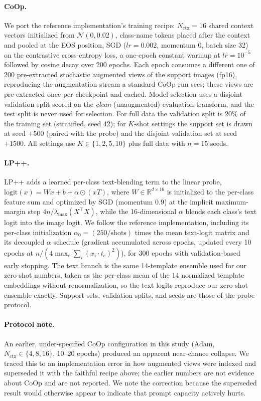 \documentclass[10pt,a4paper]{article}
\begin{document}
\paragraph{CoOp.} We port the reference implementation's training recipe: $N_{\mathrm{ctx}}=16$ shared context vectors initialized from $\mathcal{N}(0,0.02)$, class-name tokens placed after the context and pooled at the EOS position, SGD ($lr=0.002$, momentum 0, batch size 32) on the contrastive cross-entropy loss, a one-epoch constant warmup at $lr=10^{-5}$ followed by cosine decay over 200 epochs. Each epoch consumes a different one of 200 pre-extracted stochastic augmented views of the support images (fp16), reproducing the augmentation stream a standard CoOp run sees; these views are pre-extracted once per checkpoint and cached. Model selection uses a disjoint validation split scored on the \emph{clean} (unaugmented) evaluation transform, and the test split is never used for selection. For full data the validation split is 20\% of the training set (stratified, seed 42); for $K$-shot settings the support set is drawn at seed $+500$ (paired with the probe) and the disjoint validation set at seed $+1500$. All settings use $K\in\{1,2,5,10\}$ plus full data with $n=15$ seeds.

\paragraph{LP++.} LP++ adds a learned per-class text-blending term to the linear probe, $\mathrm{logit}(x)=Wx+b+\alpha\odot(xT)$, where $W\in\mathbb{R}^{d\times16}$ is initialized to the per-class feature sum and optimized by SGD (momentum 0.9) at the implicit maximum-margin step $4n/\lambda_{\max}(X^\top X)$, while the 16-dimensional $\alpha$ blends each class's text logit into the image logit. We follow the reference implementation, including its per-class initialization $\alpha_0=(250/\text{shots})$ times the mean text-logit matrix and its decoupled $\alpha$ schedule (gradient accumulated across epochs, updated every 10 epochs at $n/(4\max_c\sum_i(x_i\!\cdot\!t_c)^2)$), for 300 epochs with validation-based early stopping. The text branch is the same 14-template ensemble used for our zero-shot numbers, taken as the per-class mean of the 14 normalized template embeddings without renormalization, so the text logits reproduce our zero-shot ensemble exactly. Support sets, validation splits, and seeds are those of the probe protocol.

\paragraph{Protocol note.} An earlier, under-specified CoOp configuration in this study (Adam, $N_{\mathrm{ctx}}\in\{4,8,16\}$, 10--20 epochs) produced an apparent near-chance collapse. We traced this to an implementation error in how augmented views were indexed and superseded it with the faithful recipe above; the earlier numbers are not evidence about CoOp and are not reported. We note the correction because the superseded result would otherwise appear to indicate that prompt capacity actively hurts.
\end{document}

